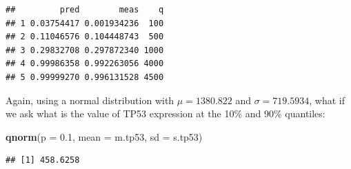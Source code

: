 \documentclass[
]{book}
\newenvironment{Shaded}{\begin{snugshade}}{\end{snugshade}}
\newcommand{\AttributeTok}[1]{\textcolor[rgb]{0.13,0.29,0.53}{#1}}
\newcommand{\CommentTok}[1]{\textcolor[rgb]{0.56,0.35,0.01}{\textit{#1}}}
\newcommand{\ControlFlowTok}[1]{\textcolor[rgb]{0.13,0.29,0.53}{\textbf{#1}}}
\newcommand{\DecValTok}[1]{\textcolor[rgb]{0.00,0.00,0.81}{#1}}
\newcommand{\FloatTok}[1]{\textcolor[rgb]{0.00,0.00,0.81}{#1}}
\newcommand{\FunctionTok}[1]{\textcolor[rgb]{0.13,0.29,0.53}{\textbf{#1}}}
\newcommand{\NormalTok}[1]{#1}
\newcommand{\OtherTok}[1]{\textcolor[rgb]{0.56,0.35,0.01}{#1}}
\newcommand{\SpecialCharTok}[1]{\textcolor[rgb]{0.81,0.36,0.00}{\textbf{#1}}}
\begin{document}
\begin{Shaded}
\end{Shaded}

\begin{verbatim}
##         pred        meas    q
## 1 0.03754417 0.001934236  100
## 2 0.11046576 0.104448743  500
## 3 0.29832708 0.297872340 1000
## 4 0.99986358 0.992263056 4000
## 5 0.99999270 0.996131528 4500
\end{verbatim}

Again, using a normal distribution with \(\mu = 1380.822\) and \(\sigma = 719.5934\), what if we ask what is the value of TP53 expression at the 10\% and 90\% quantiles:

\begin{Shaded}
\begin{Highlighting}[]
\FunctionTok{qnorm}\NormalTok{(}\AttributeTok{p =} \FloatTok{0.1}\NormalTok{, }\AttributeTok{mean =}\NormalTok{ m.tp53, }\AttributeTok{sd =}\NormalTok{ s.tp53)}
\end{Highlighting}
\end{Shaded}

\begin{verbatim}
## [1] 458.6258
\end{verbatim}
\end{document}
